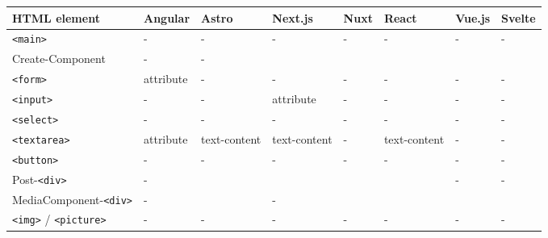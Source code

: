 \documentclass[a4paper, 10pt]{article}
\begin{document}
\begin{table}[!ht]
  \centering
  \begin{adjustbox}{angle=90}
    \begin{tabular}{|l|l|l|l|l|l|l|l|}
      \hline
      \textbf{HTML element}           & \textbf{Angular}  & \textbf{Astro}  & \textbf{Next.js}  & \textbf{Nuxt} & \textbf{React}  & \textbf{Vue.js} & \textbf{Svelte} \\ \hline
      \verb|<main>|                   & -                 & -               & -                 & -             & -               & -               & -               \\ \hline
      Create-Component                & -                 & -               & ~                 & ~             & ~               & ~               & ~               \\ \hline
      \verb|<form>|                   & attribute         & -               & -                 & -             & -               & -               & -               \\ \hline
      \verb|<input>|                  & -                 & -               & attribute         & -             & -               & -               & -               \\ \hline
      \verb|<select>|                 & -                 & -               & -                 & -             & -               & -               & -               \\ \hline
      \verb|<textarea>|               & attribute         & text-content    & text-content      & -             & text-content    & -               & -               \\ \hline
      \verb|<button>|                 & -                 & -               & -                 & -             & -               & -               & -               \\ \hline
      Post-\verb|<div>|               & -                 & ~               & ~                 & ~             & ~               & -               & -               \\ \hline
      MediaComponent-\verb|<div>|     & -                 & ~               & -                 & ~             & ~               & ~               & ~               \\ \hline
      \verb|<img>| / \verb|<picture>| & -                 & -               & -                 & -             & -               & -               & -               \\ \hline

\end{tabular}
\end{adjustbox}
\end{table}
\end{document}
